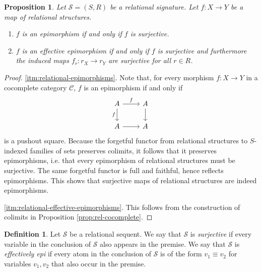 \documentclass[a4paper]{article}
\newtheorem{proposition}[theorem]{Proposition}
\theoremstyle{remark}
\theoremstyle{definition}
\newtheorem{definition}[theorem]{Definition}
\begin{document}
\begin{proposition}
  \label{prop:epimorphisms-classification}
  Let $\mathcal{S} = (S, R)$ be a relational signature.
  Let $f : X \rightarrow Y$ be a map of relational structures.
  \begin{enumerate}
    \item
      \label{itm:relational-epimorphisms}
      $f$ is an epimorphism if and only if $f$ is surjective.
    \item
      \label{itm:relational-effective-epimorphisms}
      $f$ is an effective epimorphism if and only if $f$ is surjective and furthermore the induced maps $f_r : r_X \rightarrow r_Y$ are surjective for all $r \in R$.
  \end{enumerate}
\end{proposition}
\begin{proof}
  \ref{itm:relational-epimorphisms}.
  Note that, for every morphism $f : X \rightarrow Y$ in a cocomplete category $\mathcal{C}$, $f$ is an epimorphism if and only if
  \begin{equation}
    \begin{tikzcd}
      A \arrow[r, "f"] \arrow[d, "f"'] & A \arrow[d] \\
      A \arrow[r] & A
    \end{tikzcd}
  \end{equation}
  is a pushout square.
  Because the forgetful functor from relational structures to $S$-indexed families of sets preserves colimits, it follows that it preserves epimorphisms, i.e. that every epimorphism of relational structures must be surjective.
  The same forgetful functor is full and faithful, hence reflects epimorphisms.
  This shows that surjective maps of relational structures are indeed epimorphisms.

  \ref{itm:relational-effective-epimorphisms}.
  This follows from the construction of colimits in Proposition \ref{prop:rel-cocomplete}.
\end{proof}

\begin{definition}
  Let $\mathcal{S}$ be a relational sequent.
  We say that $\mathcal{S}$ is \emph{surjective} if every variable in the conclusion of $\mathcal{S}$ also appears in the premise.
  We say that $\mathcal{S}$ is \emph{effectively epi} if every atom in the conclusion of $\mathcal{S}$ is of the form $v_1 \equiv v_2$ for variables $v_1, v_2$ that also occur in the premise.
\end{definition}
\end{document}
